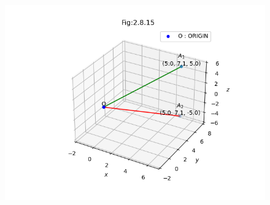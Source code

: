 \documentclass[journal]{IEEEtran}
\numberwithin{equation}{enumi}
\numberwithin{figure}{enumi}
\begin{document}
\begin{figure}[H]
    \centering
    \includegraphics[width=1\columnwidth]{figs/vector1.png}
    \caption*{}
    \label{fig:}
\end{figure}
\end{document}
